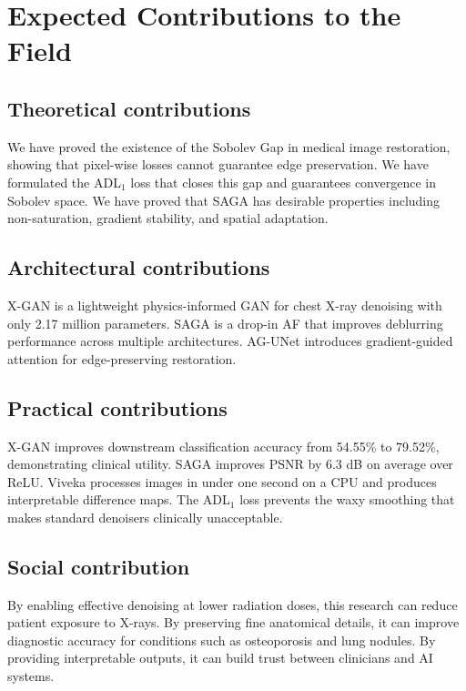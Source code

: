 
\section{Expected Contributions to the Field}
\label{sec:ec}
\subsection{Theoretical contributions}

We have proved the existence of the Sobolev Gap in medical image restoration, showing that pixel-wise losses cannot guarantee edge preservation. We have formulated the ADL\(_1\) loss that closes this gap and guarantees convergence in Sobolev space. We have proved that SAGA has desirable properties including non-saturation, gradient stability, and spatial adaptation.

\subsection{Architectural contributions}

X-GAN is a lightweight physics-informed GAN for chest X-ray denoising with only 2.17 million parameters. SAGA is a drop-in AF that improves deblurring performance across multiple architectures. AG-UNet introduces gradient-guided attention for edge-preserving restoration.

\subsection{Practical contributions}

X-GAN improves downstream classification accuracy from 54.55\% to 79.52\%, demonstrating clinical utility. SAGA improves PSNR by 6.3 dB on average over ReLU. Viveka processes images in under one second on a CPU and produces interpretable difference maps. The ADL\(_1\) loss prevents the waxy smoothing that makes standard denoisers clinically unacceptable.

\subsection{Social contribution}

By enabling effective denoising at lower radiation doses, this research can reduce patient exposure to X-rays. By preserving fine anatomical details, it can improve diagnostic accuracy for conditions such as osteoporosis and lung nodules. By providing interpretable outputs, it can build trust between clinicians and AI systems.
